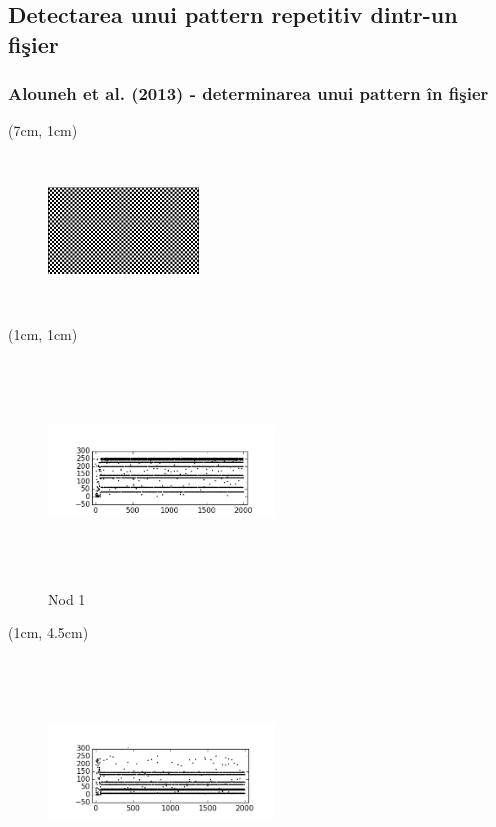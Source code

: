 \documentclass{beamer}
\theoremstyle{definition}
\begin{document}
\subsection{Detectarea unui pattern repetitiv dintr-un fi\c{s}ier}
\begin{frame}

    \frametitle{Alouneh et al. (2013) - determinarea unui pattern \^{i}n fi\c{s}ier}
     {
        \begin{textblock*}{4cm}(7cm, 1cm)
        \begin{figure}
            \includegraphics[width=4cm,height=4cm,keepaspectratio]{img/results/carouri.png}
        \end{figure}
        \end{textblock*} 
    }
     {
        \begin{textblock*}{4cm}(1cm, 1cm)
        \begin{figure}
            \includegraphics[width=6cm,height=6cm,keepaspectratio]{img/results/carouri_db1.png}
            \caption{Nod 1}
        \end{figure}
        \end{textblock*}
    }
     {
        \begin{textblock*}{4cm}(1cm, 4.5cm)
        \begin{figure}
            \includegraphics[width=6cm,height=6cm,keepaspectratio]{img/results/carouri_db2.png}

\end{figure}
\end{textblock*}}
\end{frame}
\end{document}
